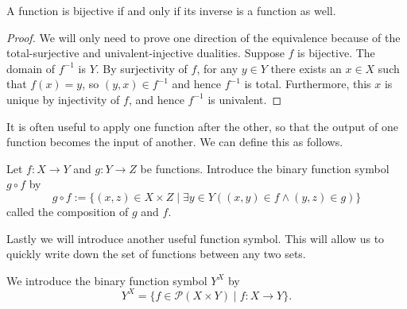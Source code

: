 \documentclass[../main.tex]{subfiles}
\begin{document}
\begin{proposition}
    A function is bijective if and only if its inverse is a function as well.
\end{proposition}
\begin{proof}
    We will only need to prove one direction of the equivalence because of the total-surjective and univalent-injective dualities. Suppose $f$ is bijective. The domain of $f^{-1}$ is $Y$. By surjectivity of $f$, for any $y\in Y$ there exists an $x\in X$ such that $f(x)=y$, so $(y,x)\in f^{-1}$ and hence $f^{-1}$ is total. Furthermore, this $x$ is unique by injectivity of $f$, and hence $f^{-1}$ is univalent.
\end{proof}

It is often useful to apply one function after the other, so that the output of one function becomes the input of another. We can define this as follows.
\begin{definition}
    Let $f:X\to Y$ and $g:Y\to Z$ be functions. Introduce the binary function symbol $g\circ f$ by
    \begin{equation*}
        g\circ f:=\{(x,z)\in X\times Z\mid\exists y\in Y((x,y)\in f\land(y,z)\in g)\}
    \end{equation*}
    called the composition of $g$ and $f$.
\end{definition}

Lastly we will introduce another useful function symbol. This will allow us to quickly write down the set of functions between any two sets.
\begin{definition}
    We introduce the binary function symbol $Y^X$ by
    \begin{equation*}
        Y^X=\{f\in\mathcal{P}(X\times Y)\mid f:X\to Y\}.
    \end{equation*}
\end{definition}
\end{document}
